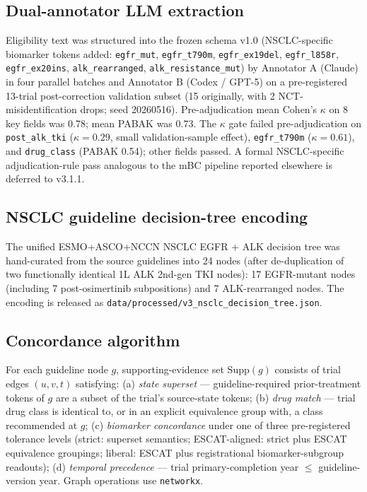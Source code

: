 \documentclass[11pt,a4paper]{article}
\begin{document}
\subsection{Dual-annotator LLM extraction}
Eligibility text was structured into the frozen schema v1.0 (NSCLC-specific biomarker tokens added: \texttt{egfr\_mut}, \texttt{egfr\_t790m}, \texttt{egfr\_ex19del}, \texttt{egfr\_l858r}, \texttt{egfr\_ex20ins}, \texttt{alk\_rearranged}, \texttt{alk\_resistance\_mut}) by Annotator A (Claude) in four parallel batches and Annotator B (Codex / GPT-5) on a pre-registered 13-trial post-correction validation subset (15 originally, with 2 NCT-misidentification drops; seed 20260516). Pre-adjudication mean Cohen's $\kappa$\citep{cohen1960kappa} on 8 key fields was 0.78; mean PABAK\citep{byrt1993pabak,viera2005} was 0.73. The $\kappa$ gate failed pre-adjudication on \texttt{post\_alk\_tki} ($\kappa = 0.29$, small validation-sample effect), \texttt{egfr\_t790m} ($\kappa = 0.61$), and \texttt{drug\_class} (PABAK 0.54); other fields passed. A formal NSCLC-specific adjudication-rule pass analogous to the mBC pipeline reported elsewhere is deferred to v3.1.1.

\subsection{NSCLC guideline decision-tree encoding}
The unified ESMO+ASCO+NCCN NSCLC EGFR + ALK decision tree was hand-curated from the source guidelines into 24 nodes (after de-duplication of two functionally identical 1L ALK 2nd-gen TKI nodes): 17 EGFR-mutant nodes (including 7 post-osimertinib subpositions) and 7 ALK-rearranged nodes. The encoding is released as \texttt{data/processed/v3\_nsclc\_decision\_tree.json}.

\subsection{Concordance algorithm}
For each guideline node $g$, supporting-evidence set $\mathrm{Supp}(g)$ consists of trial edges $(u, v, t)$ satisfying: (a) \emph{state superset} --- guideline-required prior-treatment tokens of $g$ are a subset of the trial's source-state tokens; (b) \emph{drug match} --- trial drug class is identical to, or in an explicit equivalence group with, a class recommended at $g$; (c) \emph{biomarker concordance} under one of three pre-registered tolerance levels (strict: superset semantics; ESCAT-aligned\citep{mateo2018escat}: strict plus ESCAT equivalence groupings; liberal: ESCAT plus registrational biomarker-subgroup readouts); (d) \emph{temporal precedence} --- trial primary-completion year $\le$ guideline-version year. Graph operations use \texttt{networkx}.\citep{hagberg2008networkx}
\end{document}
